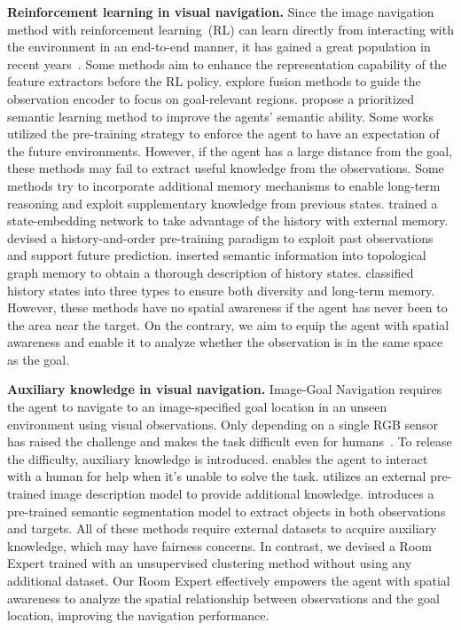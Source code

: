 \noindent\textbf{Reinforcement learning in visual navigation.} Since the image navigation method with reinforcement learning~(RL) can learn directly from interacting with the environment in an end-to-end manner, it has gained a great population in recent years~\cite{du2021curious, majumdar2022zson}. Some methods aim to enhance the representation capability of the feature extractors before the RL policy. \cite{sun2024fgprompt} explore fusion methods to guide the observation encoder to focus on goal-relevant regions. \cite{sun2025prioritized} propose a prioritized semantic learning method to improve the agents' semantic ability. Some works~\cite{li2023improving,wang2024lookahead} utilized the pre-training strategy to enforce the agent to have an expectation of the future environments. 
However, if the agent has a large distance from the goal, these methods may fail to extract useful knowledge from the observations. 
Some methods try to incorporate additional memory mechanisms to enable long-term reasoning and exploit supplementary knowledge from previous states. \cite{mezghan2022memory} trained a state-embedding network to take advantage of the history with external memory. \cite{qiao2022hop} devised a history-and-order pre-training paradigm to exploit past observations and support future prediction. \cite{kim2023topological} inserted semantic information into topological graph memory to obtain a thorough description of history states. \cite{li2024memonav} classified history states into three types to ensure both diversity and long-term memory. However, these methods have no spatial awareness if the agent has never been to the area near the target. On the contrary, we aim to equip the agent with spatial awareness and enable it to analyze whether the observation is in the same space as the goal.

\noindent\textbf{Auxiliary knowledge in visual navigation.} Image-Goal Navigation requires the agent to navigate to an image-specified goal location in an unseen environment using visual observations. Only depending on a single RGB sensor has raised the challenge and makes the task difficult even for humans~\cite{paul2022avlen}. To release the difficulty, auxiliary knowledge is introduced. \cite{liu2024caven} enables the agent to interact with a human for help when it's unable to solve the task. \cite{li2023kerm} utilizes an external pre-trained image description model to provide additional knowledge. \cite{kim2023topological} introduces a pre-trained semantic segmentation model to extract objects in both observations and targets. All of these methods require external datasets to acquire auxiliary knowledge, which may have fairness concerns. In contrast, we devised a Room Expert trained with an unsupervised clustering method without using any additional dataset. Our Room Expert effectively empowers the agent with spatial awareness to analyze the spatial relationship between observations and the goal location, improving the navigation performance.
